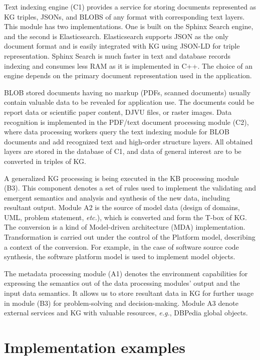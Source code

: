 \documentclass[a4paper]{jctart19a}
\begin{document}
Text indexing engine (C1) provides a service for storing documents represented as KG triples, JSONs, and BLOBS of any format with corresponding text layers.  This module has two implementations.  One is built on the Sphinx Search engine, and the second is Elasticsearch.  Elasticsearch supports JSON as the only document format and is easily integrated with KG using JSON-LD for triple representation.  Sphinx Search is much faster in text and database records indexing and consumes less RAM as it is implemented in C++.  The choice of an engine depends on the primary document representation used in the application.

BLOB stored documents having no markup (PDFs, scanned documents) usually contain valuable data to be revealed for application use.  The documents could be report data or scientific paper content, DJVU files, or raster images.  Data recognition is implemented in the PDF/text document processing module (C2), where data processing workers query the text indexing module for BLOB documents and add recognized text and high-order structure layers.  All obtained layers are stored in the database of C1, and data of general interest are to be converted in triples of KG.

A generalized KG processing is being executed in the KB processing module (B3).  This component denotes a set of rules used to implement the validating and emergent semantics and analysis and synthesis of the new data, including resultant output.  Module A2 is the source of model data (design of domains, UML, problem statement, \emph{etc.}), which is converted and form the T-box of KG.  The conversion is a kind of Model-driven architecture (MDA) implementation.  Transformation is carried out under the control of the Platform model, describing a context of the conversion.  For example, in the case of software source code synthesis, the software platform model is used to implement model objects.

The metadata processing module (A1) denotes the environment capabilities for expressing the semantics out of the data processing modules' output and the input data semantics.  It allows us to store resultant data in KG for further usage in module (B3) for problem-solving and decision-making.  Module A3 denote external services and KG with valuable resources, \emph{e.g.}, DBPedia global objects.

\section{Implementation examples}
\end{document}
